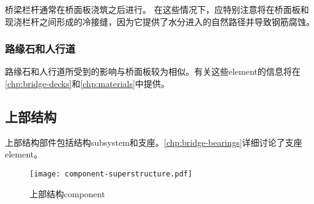 桥梁栏杆通常在桥面板浇筑之后进行。 在这些情况下，应特别注意将在桥面板和现浇栏杆之间形成的冷接缝，因为它提供了水分进入的自然路径并导致钢筋腐蚀。

\subsubsection{路缘石和人行道}
路缘石和人行道所受到的影响与桥面板较为相似。有关这些\gls*{element}的信息将在\cref{chp:bridge-decks}和\cref{chp:materials}中提供。

\subsection{上部结构}
\label{subsec:superstructure-componet}

上部结构部件包括结构\gls*{subsystem}和支座。\cref{chp:bridge-bearings}详细讨论了支座\gls*{element}。

\begin{figure}
  \texttt{[image: component-superstructure.pdf]}
  \caption{上部结构\gls*{component}}
  \label{fig:superstructure-component}
\end{figure}

